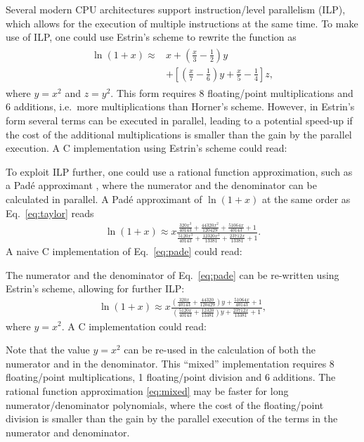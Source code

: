 \documentclass[10pt,DIV16,twocolumn,numbers=noenddot]{scrartcl}
\begin{document}
Several modern CPU architectures support instruction\-/level
parallelism (ILP), which allows for the execution of multiple
instructions at the same time.  To make use of ILP, one could use
Estrin's scheme \cite{estrin} to rewrite the function as
%
\begin{align}
\begin{split}
  \ln(1+x) \approx{}& x + \left(\frac{x}{3}-\frac{1}{2}\right)
    y \\ &+\left[\left(\frac{x}{7}-\frac{1}{6}\right)
    y+\frac{x}{5}-\frac{1}{4}\right] z,
\end{split}\label{eq:estrin}%
\end{align}
%
where $y=x^2$ and $z=y^2$.  This form requires 8 floating\-/point
multiplications and 6 additions, i.e.\ more multiplications than
Horner's scheme.  However, in Estrin's form several terms can be
executed in parallel, leading to a potential speed-up if the cost of
the additional multiplications is smaller than the gain by the
parallel execution.  A C implementation using Estrin's scheme could
read:
%


To exploit ILP further, one could use a rational function
approximation, such as a Padé approximant \cite{pade}, where the
numerator and the denominator can be calculated in parallel.  A Padé
approximant of $\ln(1+x)$ at the same order as Eq.~\eqref{eq:taylor}
reads
%
\begin{align}
  \ln(1+x) \approx x
  \frac{\frac{320 x^3}{40143}+\frac{44320 x^2}{120429}+\frac{51064
    x}{40143}+1}{\frac{5120 x^3}{40143}+\frac{12320 x^2}{13381}+\frac{23712
    x}{13381}+1}.
  \label{eq:pade}
\end{align}
%
A naive C implementation of Eq.~\eqref{eq:pade} could read:
%

%
The numerator and the denominator of Eq.~\eqref{eq:pade} can be
re-written using Estrin's scheme, allowing for further ILP:
%
\begin{align}
  \ln(1+x) \approx x
  \frac{\left(\frac{320 x}{40143}+\frac{44320}{120429}\right)y+\frac{51064
    x}{40143}+1}{\left(\frac{5120 x}{40143}+\frac{12320}{13381}\right)y+\frac{23712
    x}{13381}+1},
  \label{eq:mixed}
\end{align}
%
where $y=x^2$.  A C implementation could read:
%

%
Note that the value $y=x^2$ can be re-used in the calculation of both
the numerator and in the denominator.  This ``mixed'' implementation
requires 8 floating\-/point multiplications, 1 floating\-/point
division and 6 additions.  The rational function approximation
\eqref{eq:mixed} may be faster for long numerator/denominator
polynomials, where the cost of the floating\-/point division is
smaller than the gain by the parallel execution of the terms in the
numerator and denominator.
\end{document}
